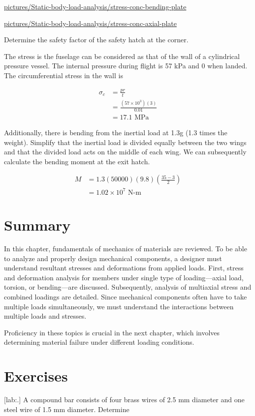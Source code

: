 \documentclass[a4paper,openany,12pt]{book}
\begin{document}
\url{pictures/Static-body-load-analysis/stress-conc-bending-plate}


\url{pictures/Static-body-load-analysis/stress-conc-axial-plate}

Determine the safety factor of the safety hatch at the corner.

The stress is the fuselage can be considered as that of the wall of a
cylindrical pressure vessel. The internal pressure during flight is 57
kPa and 0 when landed. The circumferential stress in the wall is

$$\begin{aligned}
    \sigma_c &= \frac{pr}{t} \\
             &= \frac{(57 \times 10^3)(3)}{0.01} \\
             &= 17.1 \text{ MPa}
  \end{aligned}$$

Additionally, there is bending from the inertial load at 1.3g (1.3 times
the weight). Simplify that the inertial load is divided equally between
the two wings and that the divided load acts on the middle of each wing.
We can subsequently calculate the bending moment at the exit hatch.

$$\begin{aligned}
    M &= 1.3(50000)(9.8) \left( \frac{35-3}{2} \right) \\
      &= 1.02 \times 10^7 \text{ N-m}
  \end{aligned}$$

\section{Summary}
\label{sec:org693fd19}
In this chapter, fundamentals of mechanics of materials are reviewed. To
be able to analyze and properly design mechanical components, a designer
must understand resultant stresses and deformations from applied loads.
First, stress and deformation analysis for members under single type of
loading---axial load, torsion, or bending---are discussed. Subsequently,
analysis of multiaxial stress and combined loadings are detailed. Since
mechanical components often have to take multiple loads simultaneously,
we must understand the interactions between multiple loads and stresses.

Proficiency in these topics is crucial in the next chapter, which
involves determining material failure under different loading
conditions.

\section{Exercises}
\label{sec:org3e4be29}
[lab:.] A compound bar consists of
four brass wires of 2.5 mm diameter and one steel wire of 1.5 mm
diameter. Determine
\end{document}
